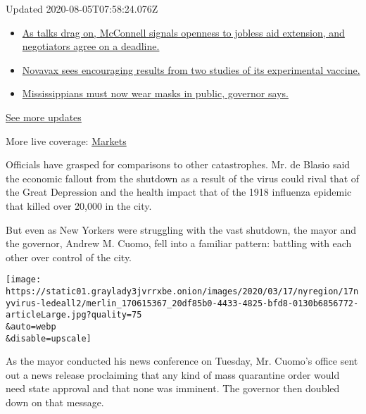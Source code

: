 Updated 2020-08-05T07:58:24.076Z

\begin{itemize}
\tightlist
\item
  \href{https://www.nytimes3xbfgragh.onion/2020/08/04/world/coronavirus-cases.html?action=click\&pgtype=Article\&state=default\&region=MAIN_CONTENT_1\&context=storylines_live_updates\#link-762df92}{As
  talks drag on, McConnell signals openness to jobless aid extension,
  and negotiators agree on a deadline.}
\item
  \href{https://www.nytimes3xbfgragh.onion/2020/08/04/world/coronavirus-cases.html?action=click\&pgtype=Article\&state=default\&region=MAIN_CONTENT_1\&context=storylines_live_updates\#link-1228a480}{Novavax
  sees encouraging results from two studies of its experimental
  vaccine.}
\item
  \href{https://www.nytimes3xbfgragh.onion/2020/08/04/world/coronavirus-cases.html?action=click\&pgtype=Article\&state=default\&region=MAIN_CONTENT_1\&context=storylines_live_updates\#link-794484ed}{Mississippians
  must now wear masks in public, governor says.}
\end{itemize}

\href{https://www.nytimes3xbfgragh.onion/2020/08/04/world/coronavirus-cases.html?action=click\&pgtype=Article\&state=default\&region=MAIN_CONTENT_1\&context=storylines_live_updates}{See
more updates}

More live coverage:
\href{https://www.nytimes3xbfgragh.onion/live/2020/08/04/business/stock-market-today-coronavirus?action=click\&pgtype=Article\&state=default\&region=MAIN_CONTENT_1\&context=storylines_live_updates}{Markets}

Officials have grasped for comparisons to other catastrophes. Mr. de
Blasio said the economic fallout from the shutdown as a result of the
virus could rival that of the Great Depression and the health impact
that of the 1918 influenza epidemic that killed over 20,000 in the city.

But even as New Yorkers were struggling with the vast shutdown, the
mayor and the governor, Andrew M. Cuomo, fell into a familiar pattern:
battling with each other over control of the city.

\texttt{[image: https://static01.graylady3jvrrxbe.onion/images/2020/03/17/nyregion/17nyvirus-ledeall2/merlin\_170615367\_20df85b0-4433-4825-bfd8-0130b6856772-articleLarge.jpg?quality=75\\\&auto=webp\\\&disable=upscale]}

As the mayor conducted his news conference on Tuesday, Mr. Cuomo's
office sent out a news release proclaiming that any kind of mass
quarantine order would need state approval and that none was imminent.
The governor then doubled down on that message.

